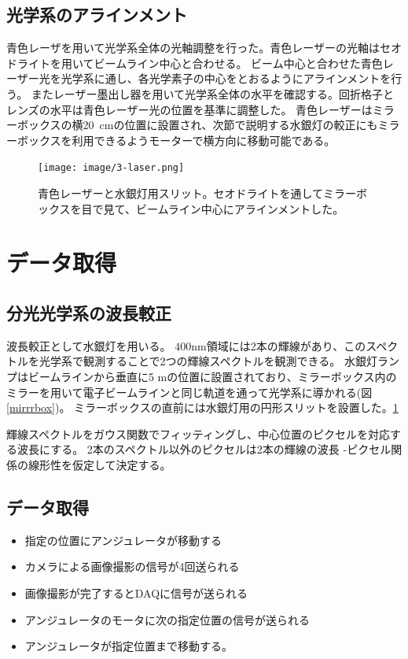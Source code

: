 \documentclass[a4paper,11pt,uplatex]{jsbook}
\begin{document}
\subsection{光学系のアラインメント}
青色レーザを用いて光学系全体の光軸調整を行った。青色レーザーの光軸はセオドライトを用いてビームライン中心と合わせる。
ビーム中心と合わせた青色レーザー光を光学系に通し、各光学素子の中心をとおるようにアラインメントを行う。
またレーザー墨出し器を用いて光学系全体の水平を確認する。回折格子とレンズの水平は青色レーザー光の位置を基準に調整した。
青色レーザーはミラーボックスの横20~cmの位置に設置され、次節で説明する水銀灯の較正にもミラーボックスを利用できるようモーターで横方向に移動可能である。
\begin{figure}
  \centering
  \texttt{[image: image/3-laser.png]}\\
  \caption[青色レーザー]{青色レーザーと水銀灯用スリット。セオドライトを通してミラーボックスを目で見て、ビームライン中心にアラインメントした。}
  \label{laser}
\end{figure}
\section{データ取得}


\subsection{分光光学系の波長較正}
波長較正として水銀灯を用いる。
$400 \text{nm}$領域には2本の輝線があり、このスペクトルを光学系で観測することで2つの輝線スペクトルを観測できる。
水銀灯ランプはビームラインから垂直に5 mの位置に設置されており、ミラーボックス内のミラーを用いて電子ビームラインと同じ軌道を通って光学系に導かれる(図\ref{mirrrbox})。
ミラーボックスの直前には水銀灯用の円形スリットを設置した。\ref{laser}

輝線スペクトルをガウス関数でフィッティングし、中心位置のピクセルを対応する波長にする。
2本のスペクトル以外のピクセルは2本の輝線の波長 -ピクセル関係の線形性を仮定して決定する。
\subsection{データ取得}
\begin{itemize}
  \item 指定の位置にアンジュレータが移動する
  \item カメラによる画像撮影の信号が4回送られる
  \item 画像撮影が完了するとDAQに信号が送られる
  \item アンジュレータのモータに次の指定位置の信号が送られる
  \item アンジュレータが指定位置まで移動する。
\end{itemize}
\end{document}
